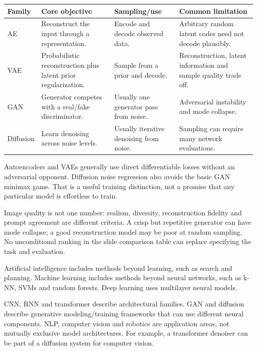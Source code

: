 \documentclass[11pt]{article}
\begin{document}
\begin{longtable}{@{}P{.14\textwidth}P{.27\textwidth}P{.24\textwidth}P{.25\textwidth}@{}}
\toprule Family & Core objective & Sampling/use & Common limitation\\\midrule\endhead
AE & Reconstruct the input through a representation. & Encode and decode observed data. & Arbitrary random latent codes need not decode plausibly.\\
VAE & Probabilistic reconstruction plus latent prior regularization. & Sample from a prior and decode. & Reconstruction, latent information and sample quality trade off.\\
GAN & Generator competes with a real/fake discriminator. & Usually one generator pass from noise. & Adversarial instability and mode collapse.\\
Diffusion & Learn denoising across noise levels. & Usually iterative denoising from noise. & Sampling can require many network evaluations.\\\bottomrule
\end{longtable}
Autoencoders and VAEs generally use direct differentiable losses without an adversarial opponent. Diffusion noise regression also avoids the basic GAN minimax game. That is a useful training distinction, not a promise that any particular model is effortless to train.

Image quality is not one number: realism, diversity, reconstruction fidelity and prompt agreement are different criteria. A crisp but repetitive generator can have mode collapse; a good reconstruction model may be poor at random sampling. No unconditional ranking in the slide comparison table can replace specifying the task and evaluation.

Artificial intelligence includes methods beyond learning, such as search and planning. Machine learning includes methods beyond neural networks, such as k-NN, SVMs and random forests. Deep learning uses multilayer neural models.

CNN, RNN and transformer describe architectural families. GAN and diffusion describe generative modeling/training frameworks that can use different neural components. NLP, computer vision and robotics are application areas, not mutually exclusive model architectures. For example, a transformer denoiser can be part of a diffusion system for computer vision.
\end{document}
